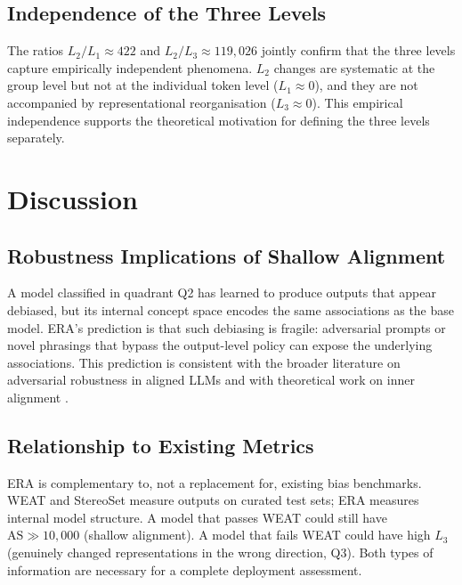 \documentclass[11pt,a4paper]{article}
\begin{document}
\subsection{Independence of the Three Levels}

The ratios $L_2/L_1 \approx 422$ and $L_2/L_3 \approx 119{,}026$ jointly confirm that
the three levels capture empirically independent phenomena. $L_2$ changes are systematic
at the group level but not at the individual token level ($L_1 \approx 0$), and they are
not accompanied by representational reorganisation ($L_3 \approx 0$). This empirical
independence supports the theoretical motivation for defining the three levels separately.

\section{Discussion}

\subsection{Robustness Implications of Shallow Alignment}

A model classified in quadrant Q2 has learned to produce outputs that appear debiased,
but its internal concept space encodes the same associations as the base model. ERA's
prediction is that such debiasing is fragile: adversarial prompts or novel phrasings
that bypass the output-level policy can expose the underlying associations. This prediction
is consistent with the broader literature on adversarial robustness in aligned LLMs and with
theoretical work on inner alignment \citep{hubinger2019}.

\subsection{Relationship to Existing Metrics}

ERA is complementary to, not a replacement for, existing bias benchmarks. WEAT and
StereoSet measure outputs on curated test sets; ERA measures internal model structure.
A model that passes WEAT could still have $\mathrm{AS} \gg 10{,}000$ (shallow alignment).
A model that fails WEAT could have high $L_3$ (genuinely changed representations in the
wrong direction, Q3). Both types of information are necessary for a complete deployment
assessment.
\end{document}
